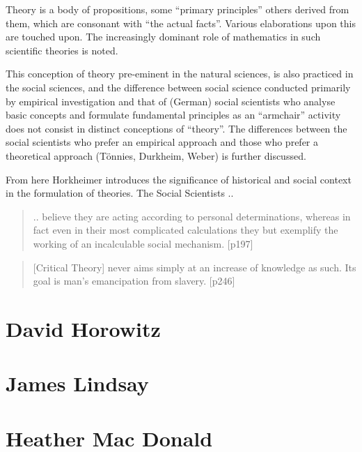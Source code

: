\documentclass[10pt,titlepage]{book}
\begin{document}
Theory is a body of propositions, some ``primary principles'' others derived from them, which are consonant with ``the actual facts''.
Various elaborations upon this are touched upon.
The increasingly dominant role of mathematics in such scientific theories is noted.

This conception of theory pre-eminent in the natural sciences, is also practiced in the social sciences, and the difference between social science conducted primarily by empirical investigation and that of (German) social scientists who analyse basic concepts and formulate fundamental principles as an ``armchair'' activity does not consist in distinct conceptions of ``theory''.
The differences between the social scientists who prefer an empirical approach and those who prefer a theoretical approach (T\"{o}nnies, Durkheim, Weber) is further discussed.

From here Horkheimer introduces the significance of historical and social context in the formulation of theories.
The Social Scientists ..
\begin{quote}
.. believe they are acting according to personal
determinations, whereas in fact even in their most complicated
calculations they but exemplify the working of an incalculable
social mechanism. [p197]
\end{quote}

\begin{quote}
  [Critical Theory] never aims simply at an increase of knowledge as such. Its goal is man's emancipation from slavery. [p246]
\end{quote}


\section{David Horowitz}

\cite{horowitz-paau,horowitz-bbal}

\section{James Lindsay}

\cite{pluckrose-cynical,lindsay-everybody,pluckrose-cynical}

\section{Heather Mac Donald}

\cite{macdonald-bbi, macdonald-woc, macdonald-tdd}
\end{document}
